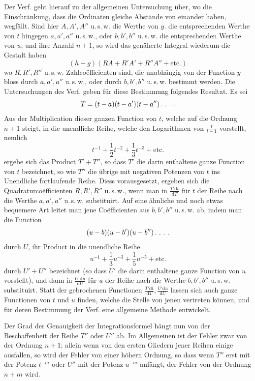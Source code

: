 Der Verf. geht hierauf zu der allgemeinen Untersuchung über, wo die Einschränkung,
dass die Ordinaten gleiche Abstände von einander haben, wegfällt.
Sind hier \(A,A',A''\) u.\,s.\,w. die Werthe von \(y\). die entsprechenden Werthe von \(t\)
hingegen \(a,a',a''\) u.\,s.\,w., oder \(b,b',b''\) u.\,s.\,w. die entsprechenden Werthe von \(u\), und
ihre Anzahl \(n+1\), so wird das genäherte Integral wiederum die Gestalt haben
\[
(h-g)(RA+R'A'+R''A''+\text{etc.})
\]
wo \(R,R',R''\) u.\,s.\,w. Zahlcoëfficienten sind, die unabhängig von der Function \(y\)
bloss durch \(a,a',a''\) u.\,s.\,w., oder durch \(b,b',b''\) u.\,s.\,w. bestimmt werden. Die Untersuchungen
des Verf. geben für diese Bestimmung folgendes Resultat. Es sei
\[
T=(t-a)(t-a')(t-a'')\,\ldotp\,\ldotp\,\ldotp\,\ldotp
\]
Aus der Multiplication dieser ganzen Function von \(t\), welche auf die Ordnung
\(n+1\) steigt, in die unendliche Reihe, welche den Logarithmen von \(\frac{t}{t-1}\) vorstellt,
nemlich
\[
t^{-1}+\frac12t^{-2}+\frac13t^{-3}+\text{etc.}
\]
ergebe sich das Product \(T'+T''\), so dass \(T'\) die darin enthaltene ganze Function
von \(t\) bezeichnet, so wie \(T''\) die übrige mit negativen Potenzen von \(t\) ins Unendliche
fortlaufende Reihe. Diess vorausgesetzt, ergeben sich die Quadraturcoëfficienten
\(R,R',R''\) u.\,s.\,w., wenn man in \(\frac{T'\mathrm{d}t}{\mathrm{d}T}\) für \(t\) der Reihe nach die Werthe
\(a,a',a''\) u.\,s.\,w. substituirt. Auf eine ähnliche und noch etwas bequemere Art
leitet man jene Coëfficienten aus \(b,b',b''\) u.\,s.\,w. ab, indem man die Function
\[
(u-b)(u-b')(u-b'')\,\ldotp\,\ldotp\,\ldotp\,\ldotp
\]
durch \(U\), ihr Product in die unendliche Reihe
\[
u^{-1}+\frac13u^{-3}+\frac15u^{-5}+\text{etc.}
\]
durch \(U'+U''\) bezeichnet (so dass \(U'\) die darin enthaltene ganze Function von
\(u\) vorstellt), und dann in \(\frac{U'\mathrm{d}u}{\mathrm{d}U}\) für \(u\) der Reihe nach die Werthe \(b,b',b''\) u.\,s.\,w.
substituirt. Statt der gebrochenen Functionen \(\frac{T'\mathrm{d}t}{\mathrm{d}T},\frac{U'\mathrm{d}u}{\mathrm{d}U}\) lassen sich auch ganze
Functionen von \(t\) und \(u\) finden, welche die Stelle von jenen vertreten können,
und für deren Bestimmung der Verf. eine allgemeine Methode entwickelt.

Der Grad der Genauigkeit der Integrationsformel hängt nun von der Beschaffenheit
der Reihe \(T''\) oder \(U''\) ab. Im Allgemeinen ist der Fehler zwar von
der Ordnung \(n+1\); allein wenn von den ersten Gliedern jener Reihen einige
ausfallen, so wird der Fehler von einer höhern Ordnung, so dass wenn \(T''\) erst
mit der Potenz \(t^{-m}\) oder \(U''\) mit der Potenz \(u^{-m}\) anfängt, der Fehler von der
Ordnung \(n+m\) wird.

